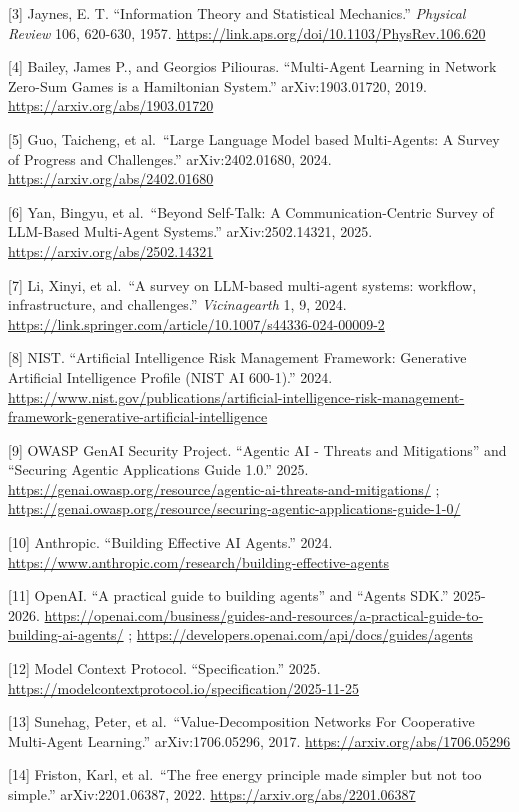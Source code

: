 \documentclass[
  11pt,
]{article}
\begin{document}
{[}3{]} Jaynes, E. T. ``Information Theory and Statistical Mechanics.''
\emph{Physical Review} 106, 620-630, 1957.
\url{https://link.aps.org/doi/10.1103/PhysRev.106.620}

{[}4{]} Bailey, James P., and Georgios Piliouras. ``Multi-Agent Learning
in Network Zero-Sum Games is a Hamiltonian System.'' arXiv:1903.01720,
2019. \url{https://arxiv.org/abs/1903.01720}

{[}5{]} Guo, Taicheng, et al.~``Large Language Model based Multi-Agents:
A Survey of Progress and Challenges.'' arXiv:2402.01680, 2024.
\url{https://arxiv.org/abs/2402.01680}

{[}6{]} Yan, Bingyu, et al.~``Beyond Self-Talk: A Communication-Centric
Survey of LLM-Based Multi-Agent Systems.'' arXiv:2502.14321, 2025.
\url{https://arxiv.org/abs/2502.14321}

{[}7{]} Li, Xinyi, et al.~``A survey on LLM-based multi-agent systems:
workflow, infrastructure, and challenges.'' \emph{Vicinagearth} 1, 9,
2024. \url{https://link.springer.com/article/10.1007/s44336-024-00009-2}

{[}8{]} NIST. ``Artificial Intelligence Risk Management Framework:
Generative Artificial Intelligence Profile (NIST AI 600-1).'' 2024.
\url{https://www.nist.gov/publications/artificial-intelligence-risk-management-framework-generative-artificial-intelligence}

{[}9{]} OWASP GenAI Security Project. ``Agentic AI - Threats and
Mitigations'' and ``Securing Agentic Applications Guide 1.0.'' 2025.
\url{https://genai.owasp.org/resource/agentic-ai-threats-and-mitigations/} ;
\url{https://genai.owasp.org/resource/securing-agentic-applications-guide-1-0/}

{[}10{]} Anthropic. ``Building Effective AI Agents.'' 2024.
\url{https://www.anthropic.com/research/building-effective-agents}

{[}11{]} OpenAI. ``A practical guide to building agents'' and ``Agents
SDK.'' 2025-2026.
\url{https://openai.com/business/guides-and-resources/a-practical-guide-to-building-ai-agents/}
; \url{https://developers.openai.com/api/docs/guides/agents}

{[}12{]} Model Context Protocol. ``Specification.'' 2025.
\url{https://modelcontextprotocol.io/specification/2025-11-25}

{[}13{]} Sunehag, Peter, et al.~``Value-Decomposition Networks For
Cooperative Multi-Agent Learning.'' arXiv:1706.05296, 2017.
\url{https://arxiv.org/abs/1706.05296}

{[}14{]} Friston, Karl, et al.~``The free energy principle made simpler
but not too simple.'' arXiv:2201.06387, 2022.
\url{https://arxiv.org/abs/2201.06387}
\end{document}
